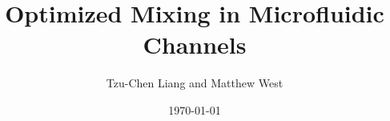 \documentclass{article}
\title{Optimized Mixing in Microfluidic Channels}
\author{Tzu-Chen Liang and Matthew West}
\date{\today}
\newcommand{\todo}[1]{\vspace{5 mm}\par \noindent
\marginpar{\textsc{Todo}}
\framebox{\begin{minipage}[c]{0.90 \textwidth}
\tt \flushleft #1 \end{minipage}}\vspace{5 mm}\par}
\renewcommand{\todo}[1]{}
\begin{document}
\maketitle

\todo{MW: In articles and similar bib records the title is changed to
  lower case automatically by bibtex. Sometimes this results in
  phrases like Markov Chain losing their capital letters, which is
  wrong. See \cite{Diaconis1996} for an example of how to fix this by
  putting braces around the letters which must be capitalized.}

\begin{abstract}

\end{abstract}













%
 

\end{document}
